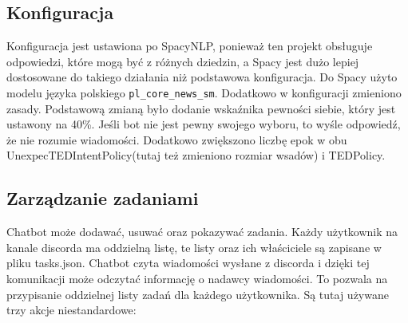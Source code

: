 \documentclass{article}
\begin{document}
\subsection{Konfiguracja}
Konfiguracja jest ustawiona po SpacyNLP, ponieważ ten projekt obsługuje
odpowiedzi, które mogą być z różnych dziedzin, a Spacy jest dużo lepiej
dostosowane do takiego działania niż podstawowa konfiguracja. Do Spacy użyto
modelu języka polskiego \verb|pl_core_news_sm|. Dodatkowo w konfiguracji
zmieniono zasady. Podstawową zmianą było dodanie wskaźnika pewności siebie,
który jest ustawony na 40\%. Jeśli bot nie jest pewny swojego wyboru, to wyśle
odpowiedź, że nie rozumie wiadomości. Dodatkowo zwiększono liczbę epok w obu
UnexpecTEDIntentPolicy(tutaj też zmieniono rozmiar wsadów) i TEDPolicy.

\subsection{Zarządzanie zadaniami}
Chatbot może dodawać, usuwać oraz pokazywać zadania. Każdy użytkownik na kanale
discorda ma oddzielną listę, te listy oraz ich właściciele są zapisane w pliku
tasks.json. Chatbot czyta wiadomości wysłane z discorda i dzięki tej
komunikacji może odczytać informację o nadawcy wiadomości. To pozwala na
przypisanie oddzielnej listy zadań dla każdego użytkownika. Są tutaj używane
trzy akcje niestandardowe:
\end{document}
